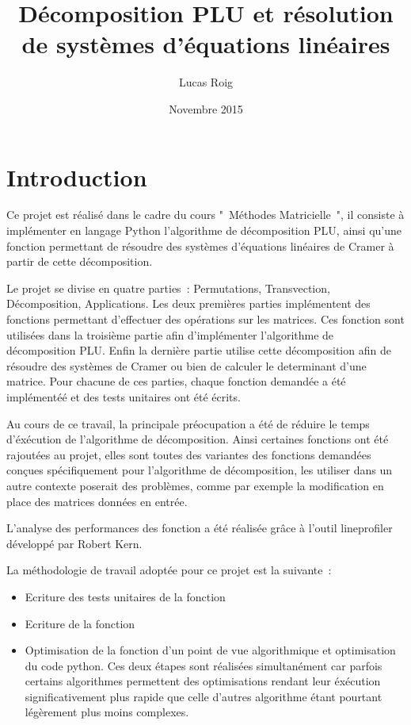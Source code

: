 \documentclass[11pt]{article}
\title{Décomposition PLU et résolution de systèmes d'équations linéaires}
\author{Lucas Roig}
\date{Novembre 2015}
\begin{document}
\maketitle

\section{Introduction}
Ce projet est réalisé dans le cadre du cours " Méthodes Matricielle ", il consiste  à implémenter en langage Python l'algorithme de décomposition PLU, ainsi qu'une fonction permettant de résoudre des systèmes d'équations linéaires de Cramer à partir de cette décomposition.

Le projet se divise en quatre parties : Permutations, Transvection, Décompo\-sition, Applications. Les deux premières parties implémentent des fonctions permettant d'effectuer des opérations sur les matrices. Ces fonction sont utilisées dans la troisième partie afin d'implémenter l'algorithme de décomposition PLU. Enfin la dernière partie utilise cette décomposition afin de résoudre des systèmes de Cramer ou bien de calculer le determinant d'une matrice. Pour chacune de ces parties, chaque fonction demandée a été implémentéé et des tests unitaires ont été écrits.

Au cours de ce travail, la principale préocupation a été de réduire le temps d'éxécution de l'algorithme de décomposition. Ainsi certaines fonctions ont été rajoutées au projet, elles sont toutes des variantes des fonctions demandées conçues spécifiquement pour l'algorithme de décomposition, les utiliser dans un autre contexte poserait des problèmes, comme par exemple la modification en place des matrices données en entrée. 

L'analyse des performances des fonction a été réalisée grâce à l'outil  lineprofiler développé par Robert Kern.

La méthodologie de travail adoptée pour ce projet est la suivante :
\begin{itemize}
\item Ecriture des tests unitaires de la fonction
\item Ecriture de la fonction
\item Optimisation de la fonction d'un point de vue algorithmique et optimisation du code python. Ces deux étapes sont réalisées simultanément car parfois certains algorithmes permettent des optimisations rendant leur éxécution significativement plus rapide que celle d'autres algorithme étant pourtant légèrement plus moins complexes.
\end{itemize}
\end{document}
